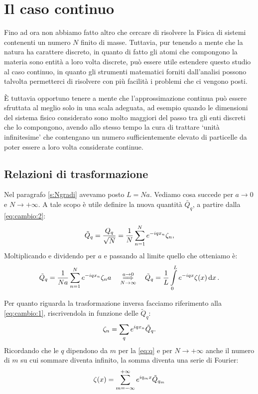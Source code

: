 \section{Il caso continuo}\label{s:casocontinuo}
    Fino ad ora non abbiamo fatto altro che cercare di risolvere la Fisica di sistemi contenenti un numero $N$ finito di masse. Tuttavia, pur tenendo a mente che la natura ha carattere discreto, in quanto di fatto gli atomi che compongono la materia sono entit\`a a loro volta discrete, pu\`o essere utile estendere questo studio al caso continuo, in quanto gli strumenti matematici forniti dall'analisi possono talvolta permetterci di risolvere con pi\`u facilit\`a i problemi che ci vengono posti.
    \par \`E tuttavia opportuno tenere a mente che l'approssimazione continua pu\`o essere sfruttata al meglio solo in una scala adeguata, ad esempio quando le dimensioni del sistema fisico considerato sono molto maggiori del passo tra gli enti discreti che lo compongono, avendo allo stesso tempo la cura di trattare `unit\`a infinitesime' che contengano un numero sufficientemente elevato di particelle da poter essere a loro volta considerate continue. 
    \subsection{Relazioni di trasformazione}
        Nel paragrafo \ref{s:Ngradi} avevamo posto $L=Na$. Vediamo cosa succede per $a\rightarrow 0$ e $N\rightarrow+\infty$. A tale scopo \`e utile definire la nuova quantit\`a $\tilde{Q_q}$, a partire dalla \eqref{eq:cambio:2}:
            $$\tilde{Q}_q=\frac{Q_q}{\sqrt{N}}=\frac{1}{N}\sum_{n=1}^Ne^{-iqx_n}\zeta_n,$$
        Moltiplicando e dividendo per $a$ e passando al limite quello che otteniamo \`e:
        \begin{equation}
            \tilde{Q}_q=\frac{1}{Na}\sum_{n=1}^Ne^{-iqx_n}\zeta_na\quad\underset{N\to\infty}{\overset{a\to 0}{\implies}}\quad\tilde{Q}_q=\frac{1}{L}\int\limits_0^Le^{-iqx}\zeta\qty(x)\dd{x}.
            \label{eq:cambiocontinuo:1}
        \end{equation}
        \par Per quanto riguarda la trasformazione inversa facciamo riferimento alla \eqref{eq:cambio:1}, riscrivendola in funzione delle $\tilde{Q}_q$:
            $$\zeta_n=\sum_qe^{iqx_n}\tilde{Q}_q.$$
        Ricordando che le $q$ dipendono da $m$ per la \eqref{eq:q} e per $N\rightarrow+\infty$ anche il numero di $m$ su cui sommare diventa infinito, la somma diventa una serie di Fourier:
        \begin{equation}
            \zeta\qty(x)=\sum_{m=-\infty}^{+\infty}e^{iq_mx}\tilde{Q}_{q_m}
            \label{eq:cambiocontinuo:2}
        \end{equation}
